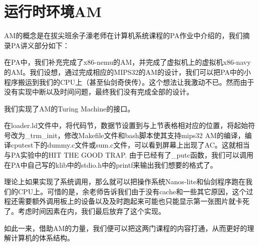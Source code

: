\section{运行时环境AM}
    AM的概念是在拔尖班余子濠老师在计算机系统课程的PA作业中介绍的，我们摘录PA讲义部分如下：

    在PA中，我们补充完成了x86-nemu的AM，并完成了虚拟机上的虚拟机x86-navy的AM。我们设想，通过完成相应的MIPS32的AM的设计，我们可以把PA中的小程序搬运到我们的CPU上（甚至仙剑奇侠传）。这个想法让我激动不已。然而由于没有实现中断以及时间问题，最终我们没有完成全部的设计。

    我们实现了AM的Turing Machine的接口。

    在loader.ld文件中，将代码节，数据节设置到与上节表格相对应的位置，将起始符号改为\_trm\_init，修改Makefile文件和bash脚本使其支持mips32 AM的编译，编译cputest下的dummy.c文件或sum.c文件，可以看到屏幕上出现了AC。这就相当与PA实验中的HIT THE GOOD TRAP. 由于已经有了\_putc函数，我们可以调用在PA中自己写的klib中的stdio.h中的printf来输出我们想要的格式了。
    
    理论上如果实现了系统调用，那么就可以把操作系统Nanos-lite和仙剑程序跑在我们的CPU上。可惜的是，余老师告诉我们由于没有cache和一些其它原因，这个过程还需要额外调用板上的设备以及及时跑起来可能也只能显示第一张图片就卡死了。考虑时间因素在内，我们最后放弃了这个实现。

    如此一来，借助AM的力量，我们便可以把这两门课程的内容打通，从而更好的理解计算机的体系结构。

